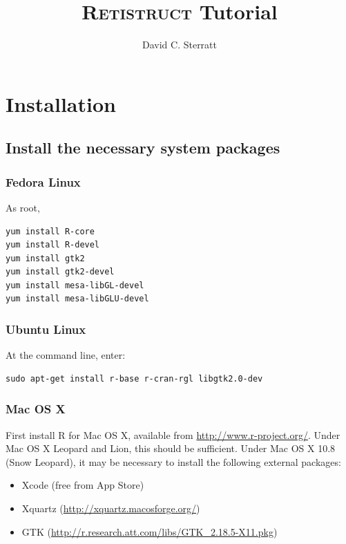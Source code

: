 \documentclass{article}
\title{\textsc{Retistruct} Tutorial}
\author{David C. Sterratt}
\begin{document}
\maketitle
\thispagestyle{myheadings}

\section{Installation}
\label{manual:sec:installation}

\subsection{Install the necessary system packages}

\subsubsection{Fedora Linux }

As root,

\begin{verbatim}
yum install R-core
yum install R-devel
yum install gtk2
yum install gtk2-devel
yum install mesa-libGL-devel
yum install mesa-libGLU-devel
\end{verbatim}

\subsubsection{Ubuntu Linux}
At the command line, enter:

\begin{verbatim}
sudo apt-get install r-base r-cran-rgl libgtk2.0-dev
\end{verbatim}

\subsubsection{Mac OS X}
\label{retistruct-manual:sec:mac}

First install R for Mac OS X, available from
\url{http://www.r-project.org/}. Under Mac OS X Leopard and Lion, this
should be sufficient. Under Mac OS X 10.8 (Snow Leopard), it may be
necessary to install the following external packages:
\begin{itemize}
\item Xcode (free from App Store)
\item Xquartz (\href{http://xquartz.macosforge.org/}{http://xquartz.macosforge.org/})
\item GTK (\href{http://r.research.att.com/libs/GTK_2.18.5-X11.pkg}{http://r.research.att.com/libs/GTK\_2.18.5-X11.pkg})
\end{itemize}
\end{document}
